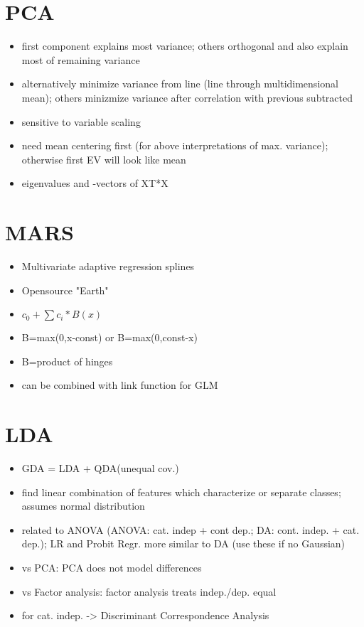 \documentclass{article}
\begin{document}
\begin{multicols}{3}
\section{PCA}
\begin{itemize}
\item first component explains most variance; others orthogonal and also explain most of remaining variance
\item alternatively minimize variance from line (line through multidimensional mean); others minizmize variance after correlation with previous subtracted
\item sensitive to variable scaling
\item need mean centering first (for above interpretations of max. variance); otherwise first EV will look like mean
\item eigenvalues and -vectors of XT*X
\end{itemize}

\section{MARS}
\begin{itemize}
\item Multivariate adaptive regression splines
\item Opensource "Earth"
\item $c_0+\sum c_i*B(x)$
\item B=max(0,x-const) or B=max(0,const-x)
\item B=product of hinges
\item can be combined with link function for GLM
\end{itemize}

\section{LDA}
\begin{itemize}
\item GDA = LDA + QDA(unequal cov.)
\item find linear combination of features which characterize or separate classes; assumes normal distribution
\item related to ANOVA (ANOVA: cat. indep + cont dep.; DA: cont. indep. + cat. dep.); LR and Probit Regr. more similar to DA (use these if no Gaussian)
\item vs PCA: PCA does not model differences
\item vs Factor analysis: factor analysis treats indep./dep. equal
\item for cat. indep. -> Discriminant Correspondence Analysis
\end{itemize}


\end{multicols}
\end{document}
